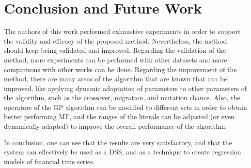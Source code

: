 \section{Conclusion and Future Work}
\label{conclusions}

The authors of this work performed exhaustive experiments in order to support the validity and efficacy of the proposed method. Nevertheless, the method should keep being validated and improved. Regarding the validation of the method, more experiments can be performed with other datasets and more comparisons with other works can be done. Regarding the improvement of the method, there are many areas of the algorithm that are known that can be improved, like applying dynamic adaptation of parameters to other parameters of the algorithm, such as the crossover, migration, and mutation chance. Also, the operators of the GP algorithm can be modified to different sets in order to obtain better performing MF, and the ranges of the literals can be adjusted (or even dynamically adapted) to improve the overall performance of the algorithm.

In conclusion, one can see that the results are very satisfactory, and that the system can effectively be used as a DSS, and as a technique to create regression models of financial time series.
  
  
  
